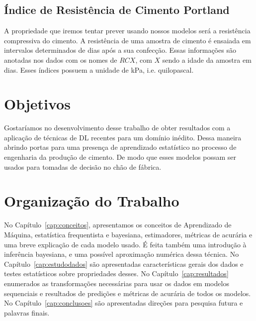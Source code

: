 \subsection{Índice de Resistência de Cimento Portland}
\label{sec:rc}
A propriedade que iremos tentar prever usando nossos modelos será a resistência
compressiva do cimento. A resistência de uma amostra de cimento é ensaiada em
intervalos determinados de dias após a sua confecção. Essas informações são
anotadas nos dados com os nomes de $RCX$, com $X$ sendo a idade da amostra em
dias. Esses índices possuem a unidade de kPa, i.e. quilopascal.

\section{Objetivos}
\label{sec:objetivo}

Gostaríamos no desenvolvimento desse trabalho de obter resultados com a
aplicação de técnicas de DL recentes para um domínio inédito. Dessa maneira
abrindo portas para uma presença de aprendizado estatístico no processo de
engenharia da produção de cimento. De modo que esses modelos possam ser usados para tomadas de decisão no chão de fábrica.


\section{Organização do Trabalho}
\label{sec:organizacao_trabalho}

No Capítulo~\ref{cap:conceitos}, apresentamos os conceitos de Aprendizado de
Máquina, estatística frequentista e bayesiana, estimadores, métricas de acurária
e uma breve explicação de cada modelo usado. É feita também uma introdução à inferência
bayesiana, e uma possível aproximação numérica dessa técnica. No
Capítulo~\ref{cap:estudodados} são apresentadas características gerais dos
dados e testes estatísticos sobre propriedades desses. No
Capítulo~\ref{cap:resultados} enumerados as transformações necessárias para usar
os dados em modelos sequenciais e resultados de predições e métricas de
acurária de todos os modelos. No Capítulo~\ref{cap:conclusoes} são apresentadas
direções para pesquisa futura e palavras finais. 



